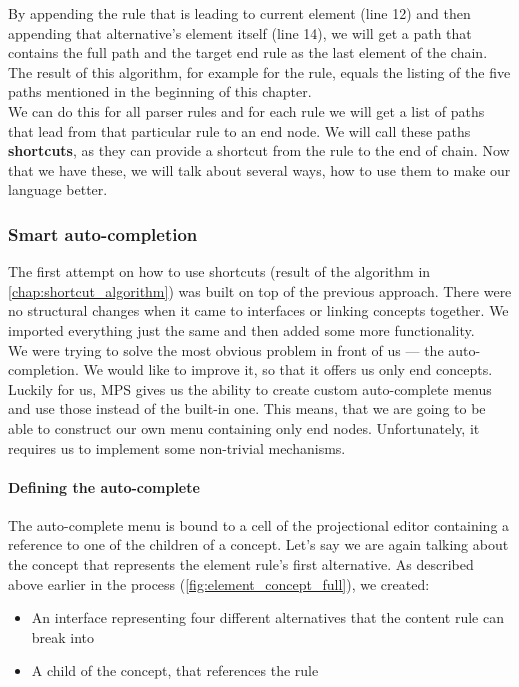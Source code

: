 By appending the rule that is leading to current element (line 12) and then appending that alternative's element itself (line 14), we will get a path that contains the full path and the target end rule as the last element of the chain.
The result of this algorithm, for example for the  rule, equals the listing of the five paths mentioned in the beginning of this chapter.
\\

We can do this for all parser rules and for each rule we will get a list of paths that lead from that particular rule to an end node. 
We will call these paths \textbf{shortcuts}, as they can provide a shortcut from the rule to the end of chain. 
Now that we have these, we will talk about several ways, how to use them to make our language better.

\subsubsection{Smart auto-completion}
The first attempt on how to use shortcuts (result of the algorithm in \ref{chap:shortcut_algorithm}) was built on top of the previous approach. 
There were no structural changes when it came to interfaces or linking concepts together.
We imported everything just the same and then added some more functionality.
\\

We were trying to solve the most obvious problem in front of us --- the auto-completion. 
We would like to improve it, so that it offers us only end concepts.
Luckily for us, MPS gives us the ability to create custom auto-complete menus and use those instead of the built-in one.
This means, that we are going to be able to construct our own menu containing only end nodes.
Unfortunately, it requires us to implement some non-trivial mechanisms.

\paragraph{Defining the auto-complete}

The auto-complete menu is bound to a cell of the projectional editor containing a reference to one of the children of a concept.
Let's say we are again talking about the concept that represents the element rule's first alternative.
As described above earlier in the process (\ref{fig:element_concept_full}), we created:

\begin{itemize}
	\item An interface  representing four different alternatives that the content rule can break into

	\item A child of the  concept, that references the  rule
\end{itemize}


